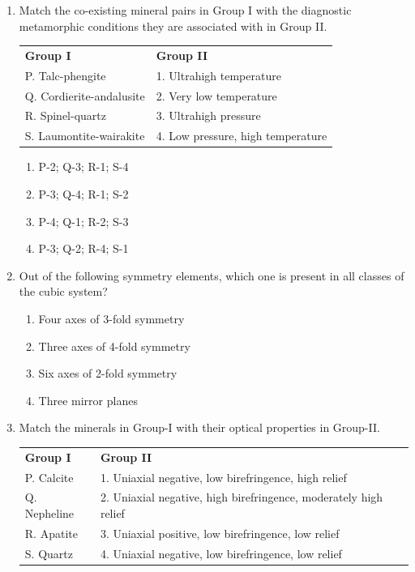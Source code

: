 \documentclass[journal,12pt,onecolumn]{IEEEtran}
\begin{document}
\begin{enumerate}
\begin{enumerate}
\item Match the co-existing mineral pairs in Group I with the diagnostic metamorphic conditions they are associated with in Group II.

\begin{tabular}{p{} p{}}
\textbf{Group I} & \textbf{Group II} \\
P. Talc-phengite & 1. Ultrahigh temperature \\
Q. Cordierite-andalusite & 2. Very low temperature \\
R. Spinel-quartz & 3. Ultrahigh pressure \\
S. Laumontite-wairakite & 4. Low pressure, high temperature \\
\end{tabular}

\hfill{}

\begin{multicols}{2}
\begin{enumerate}
\item P-2; Q-3; R-1; S-4
\item P-3; Q-4; R-1; S-2
\item P-4; Q-1; R-2; S-3
\item P-3; Q-2; R-4; S-1
\end{enumerate}
\end{multicols}

\newpage


\item Out of the following symmetry elements, which one is present in all classes of the cubic system?

\hfill{}


\begin{enumerate}
\item Four axes of 3-fold symmetry
\item Three axes of 4-fold symmetry
\item Six axes of 2-fold symmetry
\item Three mirror planes
\end{enumerate}


\item Match the minerals in Group-I with their optical properties in Group-II.

\begin{tabular}{p{} p{}}
\textbf{Group I} & \textbf{Group II} \\
P. Calcite & 1. Uniaxial negative, low birefringence, high relief \\
Q. Nepheline & 2. Uniaxial negative, high birefringence, moderately high relief \\
R. Apatite & 3. Uniaxial positive, low birefringence, low relief \\
S. Quartz & 4. Uniaxial negative, low birefringence, low relief \\
\end{tabular}


\end{enumerate}
\end{enumerate}
\end{document}
